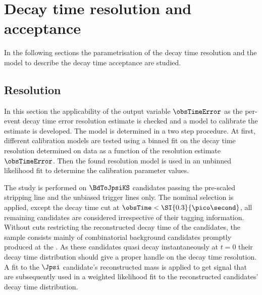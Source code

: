 
\section{Decay time resolution and acceptance}
\label{sec:measurement_of_sin2beta:resolution_and_acceptance}

In the following sections the parametrisation of the decay time resolution and
the model to describe the decay time acceptance are studied. 

\subsection{Resolution}
\label{sec:measurement_of_sin2beta:resolution_and_acceptance:resolution}

In this section the applicability of the \dtfpv output variable $\obsTimeError$ as
the per-event decay time error resolution estimate is checked and a model to
calibrate the estimate is developed. The model is determined in a two step
procedure. At first, different calibration models are tested using a binned fit
on the decay time resolution determined on data as a function of the resolution
estimate $\obsTimeError$. Then the found resolution model is used in an unbinned
likelihood fit to determine the calibration parameter values.

The study is performed on $\BdToJpsiKS$ candidates passing the pre-scaled
stripping line and the unbiased trigger lines only. The nominal selection is
applied, except the decay time cut at $\obsTime < \SI{0.3}{\pico\second}$, all
remaining candidates are considered irrespective of their tagging information.
Without cuts restricting the reconstructed decay time of the \Bd candidates, the
sample consists mainly of combinatorial background candidates promptly produced
at the \PV. As these candidates quasi decay instantaneously at $t = 0$ their
decay time distribution should give a proper handle on the decay time
resolution. A fit to the $\Jpsi$ candidate's reconstructed mass is applied to
get signal \sweights that are subsequently used in a weighted likelihood fit to
the reconstructed \Bd candidates' decay time distribution.

